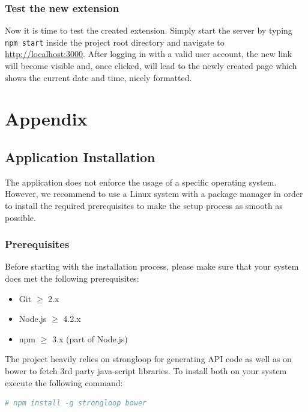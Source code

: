\documentclass[nochapterpage,nopartpage,noheadingspace,numbersubsubsec,bigchapter,colorback,accentcolor=tud9c,10pt]{tudreport}
\begin{document}
  \section{Test the new extension}
  \label{sec:tech:handson:test}

    Now it is time to test the created extension. Simply start the server by typing \texttt{npm start} inside the project root directory and navigate to \url{http://localhost:3000}. After logging in with a valid user account, the new link will become visible and, once clicked, will lead to the newly created page which shows the current date and time, nicely formatted.

\part{Appendix}
\label{part:appendix}

\appendix

  \chapter{Application Installation}
  \label{ch:appendix:setup}

    The application does not enforce the usage of a specific operating system. However, we recommend to use a Linux system with a package manager in order to install the required prerequisites to make the setup process as smooth as possible.

  \section{Prerequisites}
  \label{sec:appendix:setup:prerequisites}

    Before starting with the installation process, please make sure that your system does met the following prerequisites:
        \begin{multicols}{2}
        \begin{itemize}
            \item Git $\ge$ 2.x
            \item Node.js $\ge$ 4.2.x
            \item npm $\ge$ 3.x (part of Node.js)
        \end{itemize}
        \end{multicols}

    \noindent The project heavily relies on strongloop for generating API code as well as on bower to fetch 3rd party java-script libraries. To install both on your system execute the following command:
        \begin{lstlisting}[language=bash]
    # npm install -g strongloop bower
        \end{lstlisting}
\end{document}
